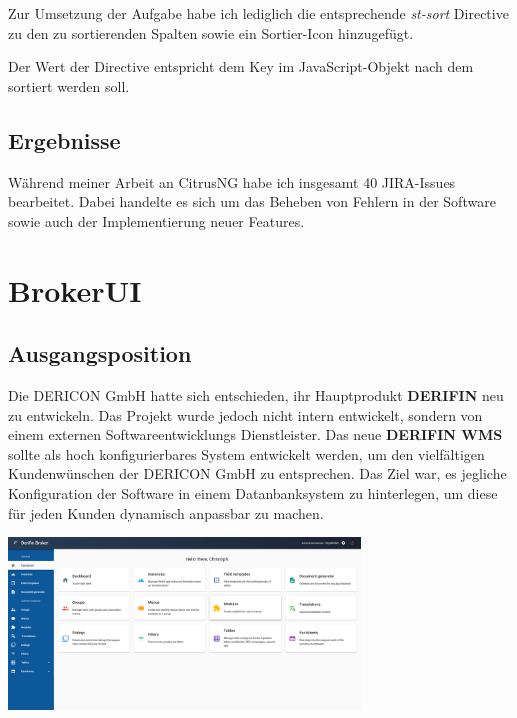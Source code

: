 \documentclass[chapterprefix=false, 12pt, a4paper, oneside, parskip=half, listof=totoc, bibliography=totoc, numbers=noendperiod]{scrbook}
\begin{document}
    Zur Umsetzung der Aufgabe habe ich lediglich die entsprechende \textit{st-sort} Directive zu den zu sortierenden
    Spalten sowie ein Sortier-Icon hinzugefügt.

    \pagebreak

    Der Wert der Directive entspricht dem Key im JavaScript-Objekt nach dem
    sortiert werden soll.

    \subsection{Ergebnisse}

    Während meiner Arbeit an CitrusNG habe ich insgesamt 40 JIRA-Issues bearbeitet. Dabei handelte
    es sich um das Beheben von Fehlern in der Software sowie auch der Implementierung neuer Features.

    \section{BrokerUI}

    \subsection{Ausgangsposition}

    Die DERICON GmbH hatte sich entschieden, ihr Hauptprodukt \textbf{DERIFIN} neu zu entwickeln.
    Das Projekt wurde jedoch nicht intern entwickelt, sondern von einem externen Softwareentwicklungs Dienstleister.
    Das neue \textbf{DERIFIN WMS} sollte als hoch konfigurierbares System entwickelt werden, um den vielfältigen
    Kundenwünschen der DERICON GmbH zu entsprechen. Das Ziel war, es jegliche Konfiguration der Software in einem
    Datanbanksystem zu hinterlegen, um diese für jeden Kunden dynamisch anpassbar zu machen.

    \begin{center}
        \includegraphics[width=0.70\textwidth]{img/broker-ui-neu.png}
    \end{center}
\end{document}
